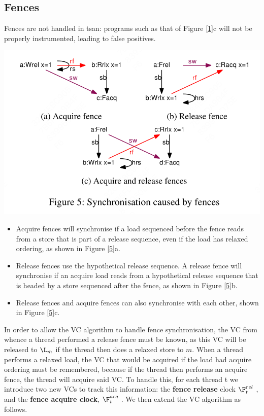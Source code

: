 \documentclass[11pt]{article}
\begin{document}
\subsection{Fences}
\label{sec:orgaea5c74}
Fences are not handled in tsan: programs such as that of Figure \ref{1}c will not be properly instrumented,
leading to false positives.

\begin{center}
\includegraphics[width=.7\textwidth]{../../images/papers/130.png}
\label{5}
\end{center}
\begin{itemize}
\item Acquire fences will synchronise if a load sequenced before the fence reads from a store that is part
of a release sequence, even if the load has relaxed ordering, as shown in Figure \ref{5}a.
\item Release fences use the hypothetical release sequence. A release fence will synchronise if an acquire
load reads from a hypothetical release sequence that is headed by a store sequenced after the fence,
as shown in Figure \ref{5}b.
\item Release fences and acquire fences can also synchronise with each other, shown in Figure \ref{5}c.
\end{itemize}

In order to allow the VC algorithm to handle fence synchronisation, the VC from whence a thread
performed a release fence must be known, as this VC will be released to \(\L_m\) if the thread then does a
relaxed store to \(m\). When a thread performs a relaxed load, the VC that would be acquired if the
load had acquire ordering must be remembered, because if the thread then performs an acquire fence,
the thread will acquire said VC. To handle this, for each thread t we introduce two new VCs to track
this information: the \textbf{fence release} clock \(\F_t^{rel}\) , and the \textbf{fence acquire clock}, \(\F_t^{acq}\) . We then extend the
VC algorithm as follows.
\end{document}
